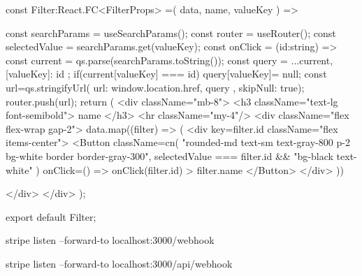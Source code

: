 const Filter:React.FC<FilterProps> =({
    data,
    name,
    valueKey
}) => {
    const searchParams = useSearchParams();
    const router = useRouter();
    const selectedValue = searchParams.get(valueKey);
    const onClick = (id:string) => {
        const current =  qs.parse(searchParams.toString());
        const query = {
            ...current,
            [valueKey]: id
        };
        if(current[valueKey] === id){
            query[valueKey]= null;
        }
        const url=qs.stringifyUrl({
            url: window.location.href,
            query
        }, { skipNull: true});
        router.push(url);
    }
    return (
        <div className="mb-8">
            <h3 className="text-lg font-semibold">
                {name}
            </h3>
            <hr className="my-4"/>
            <div className="flex flex-wrap gap-2">
                {data.map((filter) => (
                    <div key={filter.id} className="flex items-center">
                        <Button className={cn(
                            "rounded-md text-sm text-gray-800 p-2 bg-white border  border-gray-300",
                            selectedValue === filter.id && "bg-black text-white"
                        )}
                        onClick={() => onClick(filter.id)}
                        >
                            {filter.name}
                        </Button>
                    </div>
                ))}

            </div>
        </div>
    );
}

export default Filter;\]




stripe listen --forward-to localhost:3000/webhook


stripe listen --forward-to localhost:3000/api/webhook